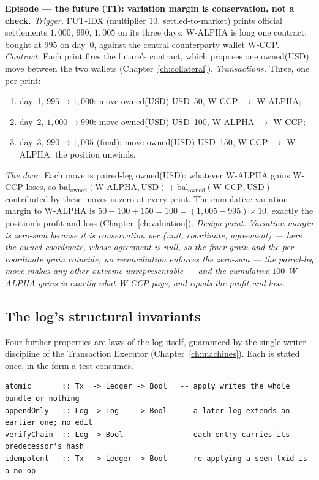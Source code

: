 \documentclass[11pt,a4paper]{article}
\newcommand{\USD}[1]{\mbox{USD~#1}}
\begin{document}
\medskip\noindent\textbf{Episode --- the future (T1): variation margin is
conservation, not a check.}
\emph{Trigger.} FUT-IDX (multiplier $10$, settled-to-market) prints official
settlements $1{,}000$, $990$, $1{,}005$ on its three days; W-ALPHA is long one
contract, bought at $995$ on day~0, against the central counterparty wallet
W-CCP. \emph{Contract.} Each print fires the future's contract, which proposes one
owned(USD) move between the two wallets (Chapter~\ref{ch:collateral}).
\emph{Transactions.} Three, one per print:
\begin{enumerate}[label=(\arabic*),nosep,leftmargin=2.2em]
\item day~1, $995\!\to\!1{,}000$: move owned(USD) \USD{50}, W-CCP $\to$ W-ALPHA;
\item day~2, $1{,}000\!\to\!990$: move owned(USD) \USD{100}, W-ALPHA $\to$ W-CCP;
\item day~3, $990\!\to\!1{,}005$ (final): move owned(USD) \USD{150}, W-CCP $\to$
  W-ALPHA; the position unwinds.
\end{enumerate}
\emph{The door.} Each move is paired-leg owned(USD): whatever W-ALPHA gains W-CCP
loses, so $\mathrm{bal}_{\text{owned}}(\text{W-ALPHA},\text{USD}) +
\mathrm{bal}_{\text{owned}}(\text{W-CCP},\text{USD})$ contributed by these moves is
zero at every print. The cumulative variation margin to W-ALPHA is
$50-100+150 = 100 = (1{,}005-995)\times 10$, exactly the position's profit and
loss (Chapter~\ref{ch:valuation}).
\emph{Design point.} \emph{Variation margin is zero-sum because it is
conservation per (unit, coordinate, agreement) --- here the owned coordinate, whose
agreement is null, so the finer grain and the per-coordinate grain coincide; no
reconciliation enforces the zero-sum ---
the paired-leg move makes any other outcome unrepresentable --- and the cumulative
$100$ W-ALPHA gains is exactly what W-CCP pays, and equals the profit and loss.}


\subsection{The log's structural invariants}

Four further properties are laws of the log itself, guaranteed by the
single-writer discipline of the Transaction Executor (Chapter~\ref{ch:machines}).
Each is stated once, in the form a test consumes.

\begin{lstlisting}
atomic       :: Tx  -> Ledger -> Bool   -- apply writes the whole bundle or nothing
appendOnly   :: Log -> Log    -> Bool   -- a later log extends an earlier one; no edit
verifyChain  :: Log -> Bool             -- each entry carries its predecessor's hash
idempotent   :: Tx  -> Ledger -> Bool   -- re-applying a seen txid is a no-op
\end{lstlisting}
\end{document}
